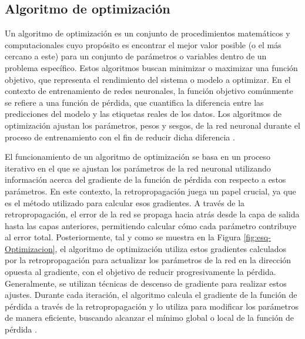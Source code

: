 \subsection{Algoritmo de optimización}\label{sec:alg-opt}
Un algoritmo de optimización es un conjunto de procedimientos matemáticos y computacionales cuyo propósito es encontrar el mejor valor posible (o el más cercano a este) para un conjunto de parámetros o variables dentro de un problema específico. Estos algoritmos buscan minimizar o maximizar una función objetivo, que representa el rendimiento del sistema o modelo a optimizar. En el contexto de entrenamiento de redes neuronales, la función objetivo comúnmente se refiere a una función de pérdida, que cuantifica la diferencia entre las predicciones del modelo y las etiquetas reales de los datos. Los algoritmos de optimización ajustan los parámetros, pesos y sesgos, de la red neuronal durante el proceso de entrenamiento con el fin de reducir dicha diferencia \cite{goodfellow2016deep}.


El funcionamiento de un algoritmo de optimización se basa en un proceso iterativo en el que se ajustan los parámetros de la red neuronal utilizando información acerca del gradiente de la función de pérdida con respecto a estos parámetros. En este contexto, la retropropagación juega un papel crucial, ya que es el método utilizado para calcular esos gradientes. A través de la retropropagación, el error de la red se propaga hacia atrás desde la capa de salida hasta las capas anteriores, permitiendo calcular cómo cada parámetro contribuye al error total. Posteriormente, tal y como se muestra en la Figura \ref{fig:esq-Optimizacion}, el algoritmo de optimización utiliza estos gradientes calculados por la retropropagación para actualizar los parámetros de la red en la dirección opuesta al gradiente, con el objetivo de reducir progresivamente la pérdida. Generalmente, se utilizan técnicas de descenso de gradiente para realizar estos ajustes. Durante cada iteración, el algoritmo calcula el gradiente de la función de pérdida a través de la retropropagación y lo utiliza para modificar los parámetros de manera eficiente, buscando alcanzar el mínimo global o local de la función de pérdida \cite{bottou2010large}.

